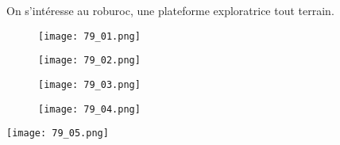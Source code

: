 \normaltrue \difficilefalse \tdifficilefalse
\correctionfalse

\setcounter{question}{0}%


\ifcorrection
\else
{}
\fi


\ifprof
\else
On s'intéresse au roburoc, une plateforme exploratrice tout terrain.


\begin{figure*}[!h]
\centering
\begin{subfigure}[c]{.23\linewidth}
\centering
\texttt{[image: 79\_01.png]}
\end{subfigure} \hfill
\begin{subfigure}[c]{.23\linewidth}
\centering
\texttt{[image: 79\_02.png]}
\end{subfigure} \hfill
\begin{subfigure}[c]{.23\linewidth}
\centering
\texttt{[image: 79\_03.png]}
\end{subfigure} 
\begin{subfigure}[c]{.23\linewidth}
\centering
\texttt{[image: 79\_04.png]}
\end{subfigure}
\end{figure*}




\begin{marginfigure}
\centering
\texttt{[image: 79\_05.png]}
\end{marginfigure} 
\fi




 

\ifprof
\else



\fi